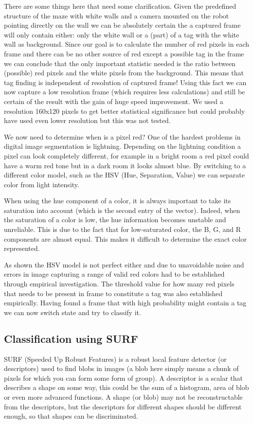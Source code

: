 There are some things here that need some clarification. Given the predefined structure of the maze with white walls and a camera mounted on the robot pointing directly on the wall we can be absolutely certain the a captured frame will only contain either: only the white wall or a (part) of a tag with the white wall as background. Since our goal is to calculate the number of red pixels in each frame and there can be no other source of red except a possible tag in the frame we can conclude that the only important statistic needed is the ratio between (possible) red pixels and the white pixels from the background. This means that tag finding is independent of resolution of captured frame! Using this fact we can now capture a low resolution frame (which requires less calculations) and still be certain of the result with the gain of huge speed improvement. We used a resolution 160x120 pixels to get better statistical significance but could probably have used even lower resolution but this was not tested.

We now need to determine when is a pixel red? One of the hardest problems in digital image segmentation is lightning. Depending on the lightning condition a pixel can look completely different, for example in a bright room a red pixel could have a warm red tone but in a dark room it looks almost blue. By switching to a different color model, such as the HSV (Hue, Separation, Value) we can separate color from light intensity. 

When using the hue component of a color, it is always important to take its saturation into account (which is the second entry of the vector). Indeed, when the saturation of a color is low, the hue information becomes unstable and unreliable. This is due to the fact that for low-saturated color, the B, G, and R components are almost equal. This makes it difficult
to determine the exact color represented. 

As shown the HSV model is not perfect either and due to unavoidable noise and errors in image capturing a range of valid red colors had to be established through empirical investigation. The threshold value for how many red pixels that needs to be present in frame to constitute a tag was also established empirically. Having found a frame that with high probability might contain a tag we can now switch state and try to classify it.

\subsection{Classification using SURF}
SURF (Speeded Up Robust Features) is a robust local feature detector (or descriptors) used to find blobs in images (a blob here simply means a chunk of pixels for which you can form some form of group).  A descriptor is a scalar that describes a shape on some way, this could be the sum of a histogram, area of blob or even more advanced functions. A shape (or blob) may not be reconstructable from the descriptors, but the descriptors for different shapes should be different enough, so that shapes can be discriminated.

